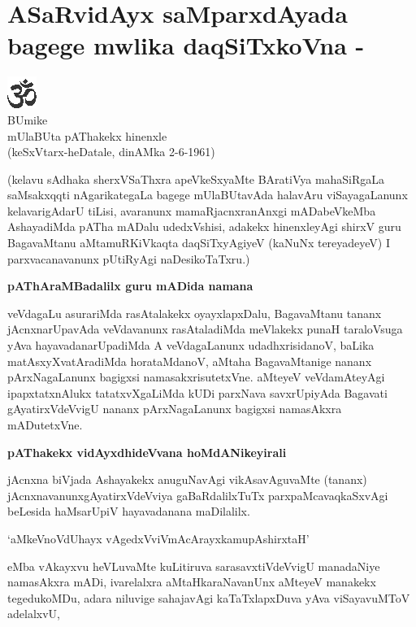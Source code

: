 \chapter{ASaRvidAyx saMparxdAyada bagege mwlika daqSiTxkoVna - }

\begin{center}
{\includegraphics[scale=.9]{om.eps}}\\[2pt]
BUmike\\[2pt]
mUlaBUta pAThakekx hinenxle\\[2pt]
(keSxVtarx-heDatale, dinAMka 2-6-1961)
\end{center}

\noindent
(kelavu sAdhaka sherxVSaThxra apeVkeSxyaMte BAratiVya mahaSiRgaLa saMsakxqqti nAgarikate\-gaLa bagege mUla\-BUta\-vAda halavAru viSayagaLanunx kelavarigAdarU tiLisi, avaranunx mamaRjacnxranAnxgi mADabeVkeMba Ashaya\-diMda pATha mADalu udedxVshisi, adakekx hinenxleyAgi shirxV guru BagavaMtanu aMtamuRKiVkaqta daqSiTx\-yAgi\-yeV (kaNuNx tereyadeyeV) I parxvacanavanunx pUtiRyAgi naDesikoTaTxru.)


{\bigskip
\noindent
{\large\bf pAThAraMBadalilx guru mADida namana}}\label{page64}
\medskip

\noindent
veVdagaLu asurariMda rasAtalakekx oyayxlapxDalu, BagavaMtanu tananx jAcnxnarUpavAda veVda\-vanunx rasA\-tala\-diMda meVlakekx punaH taraloVsuga yAva hayavadana\-rUpa\-diMda A veVda\-gaLanunx udadhxrisidanoV, baLika matAsxyXvatAradiMda hora\-taMdanoV, aMtaha BagavaMtanige nananx pArxNa\-gaLanunx bagigxsi namasakxrisu\-tetxVne. aMteyeV veVdamAteyAgi ipapxtatxnAlukx tatatxvXgaLiMda kUDi parx\-Nava savxrUpiyAda Bagavati gAya\-tirxV\-deVvigU nananx pArxNagaLanunx bagigxsi namasAkxra mADutetxVne.

{\bigskip
\noindent
{\large\bf pAThakekx vidAyxdhideVvana hoMdANikeyirali}}\label{page64}
\medskip

\noindent
jAcnxna biVjada Ashayakekx anuguNavAgi vikAsavAguvaMte (tananx) jAcnxnavanunx\break gAyatirxV\-deVviya gaBaR\-dalilxTuTx parxpaMcavaqkaSxvAgi beLesida haMsarUpiV haya\-vadanana maDilalilx.

\begin{shloka}
`aMkeVnoVdUhayx vAgedxVviVmAcArayxkamupAshirxtaH'\label{page64, 84}
\end{shloka} 

\noindent
eMba vAkayxvu heVLuvaMte kuLitiruva sarasavxtiVdeVvigU manadaNiye namasAkxra mADi, iva\-relalxra aMtaH\-karaNavanUnx aMteyeV manakekx tegedukoMDu, adara niluvige sahajavAgi kaTaTxlapxDuva yAva viSaya\-vuMToV adelalxvU, 

